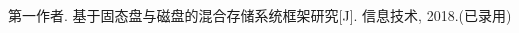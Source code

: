
\begin{publications}{99}
    \item\textsc{第一作者}. {基于固态盘与磁盘的混合存储系统框架研究}[J]. 信息技术, 2018.(已录用)
\end{publications}
